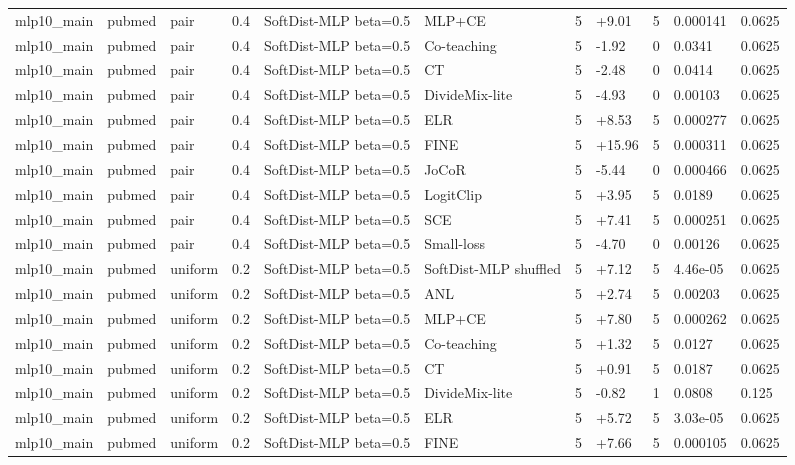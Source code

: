 \begin{table}[t]
\begin{tabular}{llllllrlrll}
mlp10_main & pubmed & pair & 0.4 & SoftDist-MLP beta=0.5 & MLP+CE & 5 & +9.01 & 5 & 0.000141 & 0.0625 \\
mlp10_main & pubmed & pair & 0.4 & SoftDist-MLP beta=0.5 & Co-teaching & 5 & -1.92 & 0 & 0.0341 & 0.0625 \\
mlp10_main & pubmed & pair & 0.4 & SoftDist-MLP beta=0.5 & CT & 5 & -2.48 & 0 & 0.0414 & 0.0625 \\
mlp10_main & pubmed & pair & 0.4 & SoftDist-MLP beta=0.5 & DivideMix-lite & 5 & -4.93 & 0 & 0.00103 & 0.0625 \\
mlp10_main & pubmed & pair & 0.4 & SoftDist-MLP beta=0.5 & ELR & 5 & +8.53 & 5 & 0.000277 & 0.0625 \\
mlp10_main & pubmed & pair & 0.4 & SoftDist-MLP beta=0.5 & FINE & 5 & +15.96 & 5 & 0.000311 & 0.0625 \\
mlp10_main & pubmed & pair & 0.4 & SoftDist-MLP beta=0.5 & JoCoR & 5 & -5.44 & 0 & 0.000466 & 0.0625 \\
mlp10_main & pubmed & pair & 0.4 & SoftDist-MLP beta=0.5 & LogitClip & 5 & +3.95 & 5 & 0.0189 & 0.0625 \\
mlp10_main & pubmed & pair & 0.4 & SoftDist-MLP beta=0.5 & SCE & 5 & +7.41 & 5 & 0.000251 & 0.0625 \\
mlp10_main & pubmed & pair & 0.4 & SoftDist-MLP beta=0.5 & Small-loss & 5 & -4.70 & 0 & 0.00126 & 0.0625 \\
mlp10_main & pubmed & uniform & 0.2 & SoftDist-MLP beta=0.5 & SoftDist-MLP shuffled & 5 & +7.12 & 5 & 4.46e-05 & 0.0625 \\
mlp10_main & pubmed & uniform & 0.2 & SoftDist-MLP beta=0.5 & ANL & 5 & +2.74 & 5 & 0.00203 & 0.0625 \\
mlp10_main & pubmed & uniform & 0.2 & SoftDist-MLP beta=0.5 & MLP+CE & 5 & +7.80 & 5 & 0.000262 & 0.0625 \\
mlp10_main & pubmed & uniform & 0.2 & SoftDist-MLP beta=0.5 & Co-teaching & 5 & +1.32 & 5 & 0.0127 & 0.0625 \\
mlp10_main & pubmed & uniform & 0.2 & SoftDist-MLP beta=0.5 & CT & 5 & +0.91 & 5 & 0.0187 & 0.0625 \\
mlp10_main & pubmed & uniform & 0.2 & SoftDist-MLP beta=0.5 & DivideMix-lite & 5 & -0.82 & 1 & 0.0808 & 0.125 \\
mlp10_main & pubmed & uniform & 0.2 & SoftDist-MLP beta=0.5 & ELR & 5 & +5.72 & 5 & 3.03e-05 & 0.0625 \\
mlp10_main & pubmed & uniform & 0.2 & SoftDist-MLP beta=0.5 & FINE & 5 & +7.66 & 5 & 0.000105 & 0.0625 \\

\end{tabular}
\end{table}
